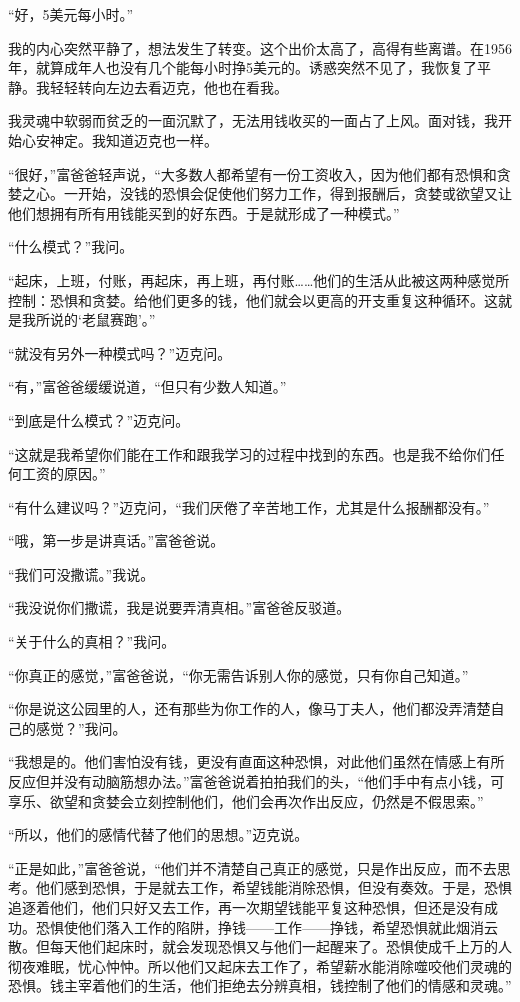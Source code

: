 “好，5美元每小时。”

我的内心突然平静了，想法发生了转变。这个出价太高了，高得有些离谱。在1956年，就算成年人也没有几个能每小时挣5美元的。诱惑突然不见了，我恢复了平静。我轻轻转向左边去看迈克，他也在看我。

我灵魂中软弱而贫乏的一面沉默了，无法用钱收买的一面占了上风。面对钱，我开始心安神定。我知道迈克也一样。

“很好，”富爸爸轻声说，“大多数人都希望有一份工资收入，因为他们都有恐惧和贪婪之心。一开始，没钱的恐惧会促使他们努力工作，得到报酬后，贪婪或欲望又让他们想拥有所有用钱能买到的好东西。于是就形成了一种模式。”

“什么模式？”我问。

“起床，上班，付账，再起床，再上班，再付账……他们的生活从此被这两种感觉所控制：恐惧和贪婪。给他们更多的钱，他们就会以更高的开支重复这种循环。这就是我所说的‘老鼠赛跑’。”

“就没有另外一种模式吗？”迈克问。

“有，”富爸爸缓缓说道，“但只有少数人知道。”

“到底是什么模式？”迈克问。

“这就是我希望你们能在工作和跟我学习的过程中找到的东西。也是我不给你们任何工资的原因。”

“有什么建议吗？”迈克问，“我们厌倦了辛苦地工作，尤其是什么报酬都没有。”

“哦，第一步是讲真话。”富爸爸说。

“我们可没撒谎。”我说。

“我没说你们撒谎，我是说要弄清真相。”富爸爸反驳道。

“关于什么的真相？”我问。

“你真正的感觉，”富爸爸说，“你无需告诉别人你的感觉，只有你自己知道。”

“你是说这公园里的人，还有那些为你工作的人，像马丁夫人，他们都没弄清楚自己的感觉？”我问。

“我想是的。他们害怕没有钱，更没有直面这种恐惧，对此他们虽然在情感上有所反应但并没有动脑筋想办法。”富爸爸说着拍拍我们的头，“他们手中有点小钱，可享乐、欲望和贪婪会立刻控制他们，他们会再次作出反应，仍然是不假思索。”

“所以，他们的感情代替了他们的思想。”迈克说。

“正是如此，”富爸爸说，“他们并不清楚自己真正的感觉，只是作出反应，而不去思考。他们感到恐惧，于是就去工作，希望钱能消除恐惧，但没有奏效。于是，恐惧追逐着他们，他们只好又去工作，再一次期望钱能平复这种恐惧，但还是没有成功。恐惧使他们落入工作的陷阱，挣钱——工作——挣钱，希望恐惧就此烟消云散。但每天他们起床时，就会发现恐惧又与他们一起醒来了。恐惧使成千上万的人彻夜难眠，忧心忡忡。所以他们又起床去工作了，希望薪水能消除噬咬他们灵魂的恐惧。钱主宰着他们的生活，他们拒绝去分辨真相，钱控制了他们的情感和灵魂。”

